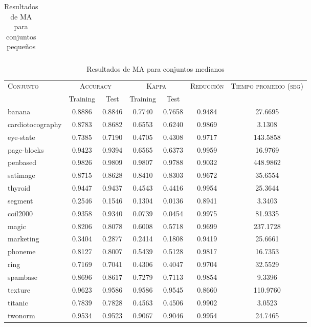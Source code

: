 \begin{table}[]
\begin{tabular}{l c c c c c c}
\hline
\end{tabular}
\caption{Resultados de MA para conjuntos pequeños }
\label{res-peq-ma}
\end{table}


\begin{table}[]
\centering
\begin{tabular}{l c c c c c c}
\hline
\multirow{2}{*}{\textsc{Conjunto}}
	& \multicolumn{2}{c}{\textsc{Accuracy}}
	& \multicolumn{2}{c}{\textsc{Kappa}}
	& \textsc{Reducción}
	& \textsc{Tiempo promedio (seg)} \\
	& Training & Test
	& Training & Test \\ 
\hline
\hline

banana & 0.8886 & 0.8846 & 0.7740 & 0.7658 & 0.9484 & 27.6695 \\
cardiotocography & 0.8783 & 0.8682 & 0.6553 & 0.6240 & 0.9869 & 3.1308 \\
eye-state & 0.7385 & 0.7190 & 0.4705 & 0.4308 & 0.9717 & 143.5858 \\
page-blocks & 0.9423 & 0.9394 & 0.6565 & 0.6373 & 0.9959 & 16.9769 \\
penbased & 0.9826 & 0.9809 & 0.9807 & 0.9788 & 0.9032 & 448.9862 \\
satimage & 0.8715 & 0.8628 & 0.8410 & 0.8303 & 0.9672 & 35.6554 \\
thyroid & 0.9447 & 0.9437 & 0.4543 & 0.4416 & 0.9954 & 25.3644 \\
segment & 0.2546 & 0.1546 & 0.1304 & 0.0136 & 0.8941 & 3.3403 \\
coil2000 & 0.9358 & 0.9340 & 0.0739 & 0.0454 & 0.9975 & 81.9335 \\
magic & 0.8206 & 0.8078 & 0.6008 & 0.5718 & 0.9699 & 237.1728 \\
marketing & 0.3404 & 0.2877 & 0.2414 & 0.1808 & 0.9419 & 25.6661 \\
phoneme & 0.8127 & 0.8007 & 0.5439 & 0.5128 & 0.9817 & 16.7353 \\
ring & 0.7169 & 0.7041 & 0.4306 & 0.4047 & 0.9704 & 32.5529 \\
spambase & 0.8696 & 0.8617 & 0.7279 & 0.7113 & 0.9854 & 9.3396 \\
texture & 0.9623 & 0.9586 & 0.9586 & 0.9545 & 0.8660 & 110.9760 \\
titanic & 0.7839 & 0.7828 & 0.4563 & 0.4506 & 0.9902 & 3.0523 \\
twonorm & 0.9534 & 0.9523 & 0.9067 & 0.9046 & 0.9954 & 24.7465 \\

\hline
\end{tabular}
\caption{Resultados de MA para conjuntos medianos }
\label{res-med-ma}
\end{table}


